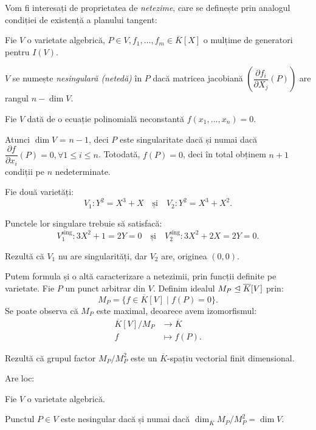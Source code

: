 Vom fi interesați de proprietatea de \emph{netezime}, care se definește prin analogul condiției
de existență a planului tangent:

\begin{definition}\label{def:neted}
  Fie $ V $ o varietate algebrică, $ P \in V, f_1, \dots, f_m \in \overline{K}[X] $ o mulțime
  de generatori pentru $ I(V) $.

  $ V $ se numește \emph{nesingulară (netedă)} în $ P $ dacă matricea jacobiană
  $ \left( \dfrac{\partial f_i}{\partial X_j}(P) \right) $ are rangul $ n - \dim V $.
\end{definition}

\begin{example}\label{exm:dim}
  Fie $ V $ dată de o ecuație polinomială neconstantă $ f(x_1, \dots, x_n) = 0 $.

  Atunci $ \dim V $ = $ n - 1 $, deci $ P $ este singularitate dacă și numai dacă
  $ \dfrac{\partial f}{\partial x_i}(P) = 0, \forall 1 \leq i \leq n $. Totodată,
  $ f(P) = 0 $, deci în total obținem $ n + 1 $ condiții pe $ n $ nedeterminate.
\end{example}

\begin{example}\label{exm:dim2}
  Fie două varietăți:
  \[
    V_1: Y^2 = X^3 + X \quad \text{și} \quad V_2: Y^2 = X^3 + X^2.
  \]

  Punctele lor singulare trebuie să satisfacă:
  \[
    V_1^{\text{sing}}: 3X^2 + 1 = 2Y = 0 \quad \text{și} \quad %
    V_2^{\text{sing}}: 3X^2 + 2X = 2Y = 0.
  \]

  Rezultă că $ V_1 $ nu are singularități, dar $ V_2 $ are, originea $ (0, 0) $.
\end{example}

Putem formula și o altă caracterizare a netezimii, prin funcții definite pe varietate.
Fie $ P $ un punct arbitrar din $ V $. Definim idealul $ M_P \trianglelefteq \overline{K}[V] $ prin:
\[
  M_P = \{ f \in \overline{K}[V] \mid f(P) = 0 \}.
\]
Se poate observa că $ M_P $ este maximal, deoarece avem izomorfismul:
\begin{align*}
  \overline{K}[V]/M_P &\to \overline{K} \\
  f &\mapsto f(P).
\end{align*}

Rezultă că grupul factor $ M_P/M_P^2 $ este un $ \overline{K} $-spațiu vectorial
finit dimensional.

Are loc:
\begin{proposition}\label{pr:var-alg}
  Fie $ V $ o varietate algebrică.

  Punctul $ P \in V $ este nesingular dacă și numai dacă $ \dim_{\overline{K}} M_P/M_P^2 = \dim V $.
\end{proposition}

